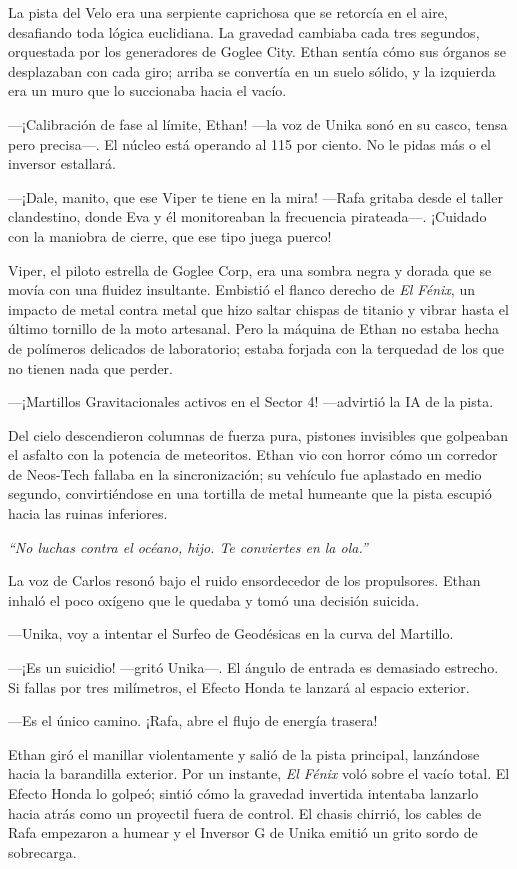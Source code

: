 \documentclass[11pt,twoside]{book}
\begin{document}
La pista del Velo era una serpiente caprichosa que se retorcía en el aire, desafiando toda lógica euclidiana. La gravedad cambiaba cada tres segundos, orquestada por los generadores de Goglee City. Ethan sentía cómo sus órganos se desplazaban con cada giro; arriba se convertía en un suelo sólido, y la izquierda era un muro que lo succionaba hacia el vacío.

---¡Calibración de fase al límite, Ethan! ---la voz de Unika sonó en su casco, tensa pero precisa---. El núcleo está operando al 115 por ciento. No le pidas más o el inversor estallará.

---¡Dale, manito, que ese Viper te tiene en la mira! ---Rafa gritaba desde el taller clandestino, donde Eva y él monitoreaban la frecuencia pirateada---. ¡Cuidado con la maniobra de cierre, que ese tipo juega puerco!

Viper, el piloto estrella de Goglee Corp, era una sombra negra y dorada que se movía con una fluidez insultante. Embistió el flanco derecho de \textit{El Fénix}, un impacto de metal contra metal que hizo saltar chispas de titanio y vibrar hasta el último tornillo de la moto artesanal. Pero la máquina de Ethan no estaba hecha de polímeros delicados de laboratorio; estaba forjada con la terquedad de los que no tienen nada que perder.

---¡Martillos Gravitacionales activos en el Sector 4! ---advirtió la IA de la pista.

Del cielo descendieron columnas de fuerza pura, pistones invisibles que golpeaban el asfalto con la potencia de meteoritos. Ethan vio con horror cómo un corredor de Neos-Tech fallaba en la sincronización; su vehículo fue aplastado en medio segundo, convirtiéndose en una tortilla de metal humeante que la pista escupió hacia las ruinas inferiores.

\textit{``No luchas contra el océano, hijo. Te conviertes en la ola.''}

La voz de Carlos resonó bajo el ruido ensordecedor de los propulsores. Ethan inhaló el poco oxígeno que le quedaba y tomó una decisión suicida.

---Unika, voy a intentar el Surfeo de Geodésicas en la curva del Martillo.

---¡Es un suicidio! ---gritó Unika---. El ángulo de entrada es demasiado estrecho. Si fallas por tres milímetros, el Efecto Honda te lanzará al espacio exterior.

---Es el único camino. ¡Rafa, abre el flujo de energía trasera!

Ethan giró el manillar violentamente y salió de la pista principal, lanzándose hacia la barandilla exterior. Por un instante, \textit{El Fénix} voló sobre el vacío total. El Efecto Honda lo golpeó; sintió cómo la gravedad invertida intentaba lanzarlo hacia atrás como un proyectil fuera de control. El chasis chirrió, los cables de Rafa empezaron a humear y el Inversor G de Unika emitió un grito sordo de sobrecarga.
\end{document}
